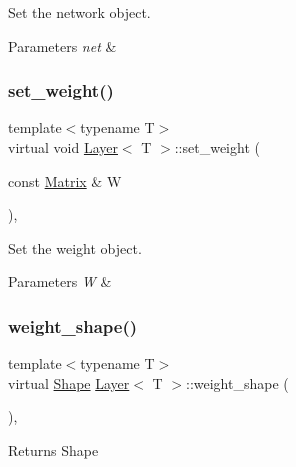 Set the network object. 


\begin{DoxyParams}{Parameters}
{\em net} & \\
\hline
\end{DoxyParams}
\mbox{\label{class_layer_a8fd54bf1a860868b13f4365a264c693c}} 
\subsubsection{\texorpdfstring{set\_weight()}{set\_weight()}}
{\footnotesize\ttfamily template$<$typename T$>$ \\
virtual void \mbox{\hyperlink{class_layer}{Layer}}$<$ T $>$\+::set\+\_\+weight (\begin{DoxyParamCaption}\item[{const \mbox{\hyperlink{class_layer_a22b1e7286096aa62bd245536c8ebdaf1}{Matrix}} \&}]{W }\end{DoxyParamCaption})\hspace{0.3cm}{\ttfamily [inline]}, {\ttfamily [virtual]}}



Set the weight object. 


\begin{DoxyParams}{Parameters}
{\em W} & \\
\hline
\end{DoxyParams}
\mbox{\label{class_layer_afa0ec609fc7ef0053a362ea54d0f6f78}} 
\subsubsection{\texorpdfstring{weight\_shape()}{weight\_shape()}}
{\footnotesize\ttfamily template$<$typename T$>$ \\
virtual \mbox{\hyperlink{class_layer_a8313f42d2292d12dd5d40cc115636693}{Shape}} \mbox{\hyperlink{class_layer}{Layer}}$<$ T $>$\+::weight\+\_\+shape (\begin{DoxyParamCaption}{ }\end{DoxyParamCaption})\hspace{0.3cm}{\ttfamily [inline]}, {\ttfamily [virtual]}}

\begin{DoxyReturn}{Returns}
Shape 
\end{DoxyReturn}


